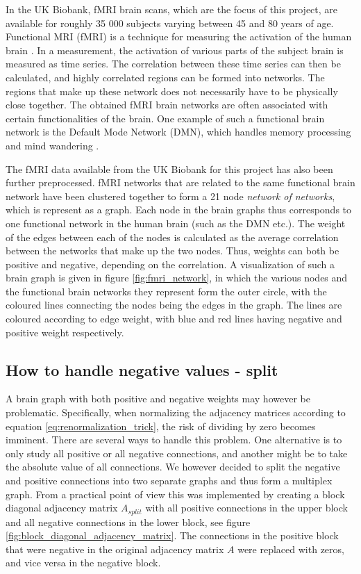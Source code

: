 In the UK Biobank, fMRI brain scans, which are the focus of this project, are available for roughly 35 000 subjects varying between 45 and 80 years of age. Functional MRI (fMRI) is a technique for measuring the activation of the human brain \cite{sporns}. In a measurement, the activation of various parts of the subject brain is measured as time series. The correlation between these time series can then be calculated, and highly correlated regions can be formed into networks. The regions that make up these network does not necessarily have to be physically close together. The obtained fMRI brain networks are often associated with certain functionalities of the brain. One example of such a functional brain network is the Default Mode Network (DMN), which handles memory processing and mind wandering \cite{alves_dmn}. 

The fMRI data available from the UK Biobank for this project has also been further preprocessed. fMRI networks that are related to the same functional brain network have been clustered together to form a 21 node \textit{network of networks}, which is represent as a graph. Each node in the brain graphs thus corresponds to one functional network in the human brain (such as the DMN etc.). The weight of the edges between each of the nodes is calculated as the average correlation between the networks that make up the two nodes. Thus, weights can both be positive and negative, depending on the correlation. A visualization of such a brain graph is given in figure \ref{fig:fmri_network}, in which the various nodes and the functional brain networks they represent form the outer circle, with the coloured lines connecting the nodes being the edges in the graph. The lines are coloured according to edge weight, with blue and red lines having negative and positive weight respectively.

\subsection{How to handle negative values - split}

A brain graph with both positive and negative weights may however be problematic. Specifically, when normalizing the adjacency matrices according to equation \eqref{eq:renormalization_trick}, the risk of dividing by zero becomes imminent. There are several ways to handle this problem. One alternative is to only study all positive or all negative connections, and another might be to take the absolute value of all connections. We however decided to split the negative and positive connections into two separate graphs and thus form a multiplex graph. From a practical point of view this was implemented by creating a block diagonal adjacency matrix $A_{split}$ with all positive connections in the upper block and all negative connections in the lower block, see figure \ref{fig:block_diagonal_adjacency_matrix}. The connections in the positive block that were negative in the original adjacency matrix $A$ were replaced with zeros, and vice versa in the negative block.

